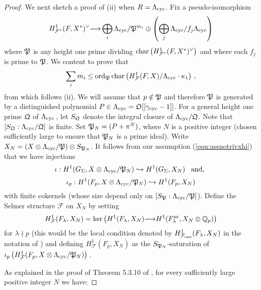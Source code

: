 \documentclass[12pt]{amsart}
\numberwithin{equation}{section}
\begin{document}
\begin{proof}
We next sketch a proof of (ii) when $R={\Lambda}_{\textup{cyc}}$. Fix a pseudo-isomorphism 
$$H^1_{{\mathcal{F}}^*}(F,X^*)^\vee {\longrightarrow} \bigoplus_{i}\Lambda_{\textup{cyc}}/\frak{P}^{m_i} \oplus\left(\bigoplus_j\Lambda_{\textup{cyc}}/f_j\Lambda_{\textup{cyc}}\right)$$
where $\frak{P}$ is any height one prime dividing ${\textup{char}}\left(H^1_{{\mathcal{F}}^*}(F,X^*)^\vee\right)$ and where each $f_j$ is prime to $\frak{P}$. We content to prove  that
\begin{equation}\label{eqn:sufficientinequality}
\sum_{i}m_i\leq \textup{ord}_\frak{P}\, \textup{char}\left(H^1_{\mathcal{F}}(F,X)/{\Lambda}_{\textup{cyc}}\cdot\kappa_1\right)\,,
\end{equation}
from which follows (ii). We will assume that $p\notin \frak{P}$ and therefore $\frak{P}$ is generated by a distinguished polynomial $P \in {\Lambda}_{\textup{cyc}}={\frak{O}}[[\gamma_{\textup{cyc}}-1]]$. For a general height one prime $\frak{Q}$ of ${\Lambda}_{\textup{cyc}}$\,, let $S_\frak{Q}$ denote the integral closure of ${\Lambda}_{\textup{cyc}}/\frak{Q}$. Note that $[S_\frak{Q}:{\Lambda}_{\textup{cyc}}/\frak{Q}]$ is finite. Set $\frak{P}_N=(P+\pi^N)$, where $N$ is a positive integer (chosen sufficiently large to ensure that $\frak{P}_N$ is a prime ideal). Write $X_N=(X\otimes{\Lambda}_{\textup{cyc}}/\frak{P})\otimes S_{\frak{P}_N}$. It follows from our assumption (\ref{eqn:assnotrivxhi}) that we have injections 
$$\iota: H^1(G_\Sigma,X\otimes{\Lambda}_{\textup{cyc}}/\frak{P}_N) \hookrightarrow H^1(G_\Sigma,X_N) \hbox{\,\,\, and, }$$
$$\iota_p: H^1(F_p,X\otimes{\Lambda}_{\textup{cyc}}/\frak{P}_N) \hookrightarrow H^1(F_p,X_N) $$
with finite cokernels (whose size depend only on $[S_\frak{P}:{\Lambda}_{\textup{cyc}}/\frak{P}]$). Define the Selmer structure ${\mathcal{F}}$ on $X_N$ by setting 
$$H^1_{\mathcal{F}}(F_\lambda,X_N)=\ker\left(H^1(F_\lambda,X_N){\longrightarrow} H^1(F_\lambda^\textup{ur},X_N\otimes{\mathbb{Q}}_p)\right)$$
for $\lambda\nmid p$ (this would be the local condition denoted by $H^1_{\mathcal{F}_{\textup{\lowercase{can}}}}(F_\lambda,X_N)$ in the notation of \cite{mr02}) and defining $H^1_{\mathcal{F}}(F_p,X_N)$ as the $S_{\frak{P}_N}$-saturation of $\iota_p\left(H^1_{\mathcal{F}}(F_p,X\otimes{\Lambda}_{\textup{cyc}}/\frak{P}_N)\right)$\,.

As explained in the proof of Theorem 5.3.10 of \cite{mr02}, for every sufficiently large positive integer $N$ we have:


\end{proof}
\end{document}
